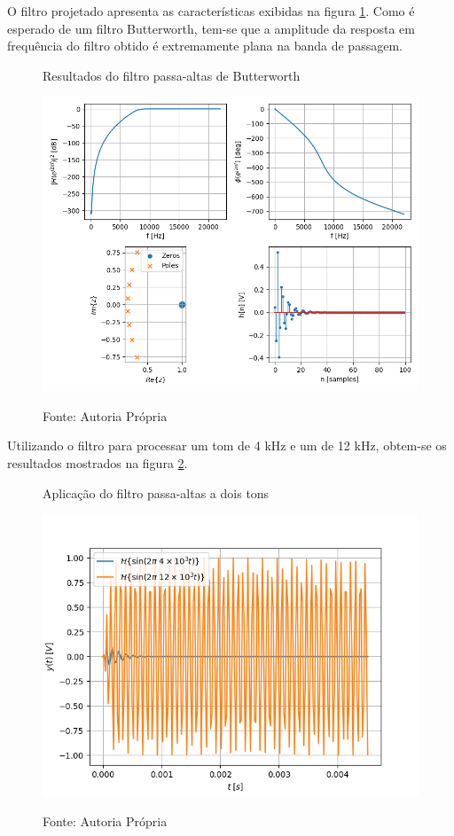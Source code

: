 \documentclass[12pt,a4paper]{report}
\begin{document}
  O filtro projetado apresenta as características exibidas na figura \ref{fig:butter_results}. Como é esperado
  de um filtro Butterworth, tem-se que a amplitude da resposta em frequência do filtro obtido é extremamente
  plana na banda de passagem.
  \begin{figure}[H]
    \caption{Resultados do filtro passa-altas de Butterworth}
    \centering
    \includegraphics[width=\textwidth]{images/butter_results}
    \label{fig:butter_results}
    \caption*{Fonte: Autoria Própria}
  \end{figure}

  Utilizando o filtro para processar um tom de 4 kHz e um de 12 kHz, obtem-se os resultados mostrados na figura
  \ref{fig:butter_tones}.
  \begin{figure}[H]
    \caption{Aplicação do filtro passa-altas a dois tons}
    \centering
    \includegraphics[width=\textwidth]{images/butter_tones}
    \label{fig:butter_tones}
    \caption*{Fonte: Autoria Própria}
  \end{figure}
\end{document}
